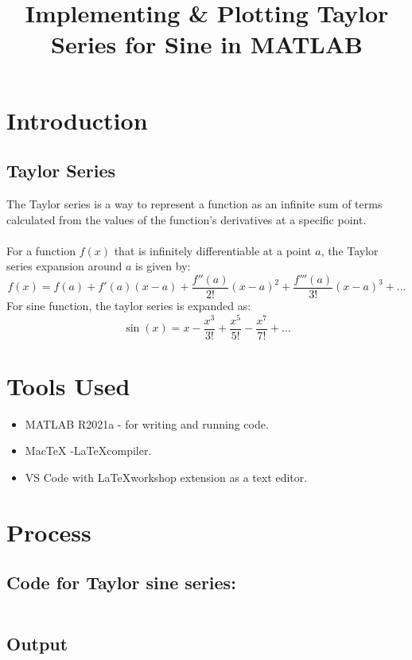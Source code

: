 \clearpage
\title{Implementing \& Plotting Taylor Series for Sine in MATLAB}
\author{}
\date{}
\maketitle

\section*{Introduction}
\subsection*{Taylor Series}
The Taylor series is a way to represent a function as an infinite sum of terms calculated from the values of the function's derivatives at a specific point.\\\\
For a function \(f(x)\) that is infinitely differentiable at a point \(a\), the Taylor series expansion around \(a\) is given by:
\[f(x) = f(a) + f'(a)(x-a) + \frac{f''(a)}{2!}(x-a)^2 + \frac{f'''(a)}{3!}(x-a)^3 + \ldots
\]
For sine function, the taylor series is expanded as:
\[\sin(x) = x - \frac{x^3}{3!} + \frac{x^5}{5!} - \frac{x^7}{7!} + \ldots\]

\section*{Tools Used}
\begin{itemize}
    \item MATLAB R2021a - for writing and running code.
    \item MacTeX -\LaTeX  compiler.
    \item VS Code with \LaTeX workshop extension as a text editor.
\end{itemize}

\section*{Process}
\subsection*{Code for Taylor sine series:}
\begin{verbatim}

\end{verbatim}
\subsection*{Output}
\begin{center}
    \centering
\end{center}



